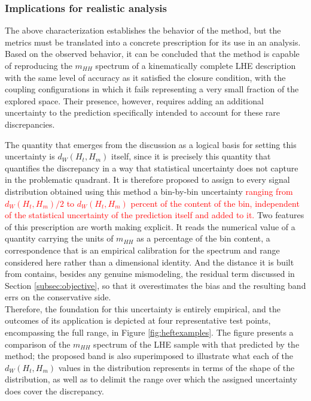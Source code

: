 
\subsubsection{Implications for realistic analysis}
\label{subsec:uncertainties}
%
The above characterization establishes the behavior of the method, but the metrics must be translated into a concrete prescription for its use in an analysis. Based on the observed behavior, it can be concluded that the method is capable of reproducing the $m_{HH}$ spectrum of a kinematically complete LHE description with the same level of accuracy as it satisfied the closure condition, with the coupling configurations in which it fails representing a very small fraction of the explored space. Their presence, however, requires adding an additional uncertainty to the prediction specifically intended to account for these rare discrepancies.

The quantity that emerges from the discussion as a logical basis for setting this uncertainty is $d_W(H_{t},H_{m})$ itself, since it is precisely this quantity that quantifies the discrepancy in a way that statistical uncertainty does not capture in the problematic quadrant. It is therefore proposed to assign to every signal distribution obtained using this method a bin-by-bin uncertainty \textcolor{red}{ranging from $d_W(H_{t},H_{m})/2$ to $d_W(H_{t},H_{m})$ percent of the content of the bin, independent of the statistical uncertainty of the prediction itself and added to it.} Two features of this prescription are worth making explicit. It reads the numerical value of a quantity carrying the units of $m_{HH}$ as a percentage of the bin content, a correspondence that is an empirical calibration for the spectrum and range considered here rather than a dimensional identity. And the distance it is built from contains, besides any genuine mismodeling, the residual term discussed in Section \ref{subsec:objective}, so that it overestimates the bias and the resulting band errs on the conservative side.\\

Therefore, the foundation for this uncertainty is entirely empirical, and the outcomes of its application is depicted at four representative test points, encompassing the full range, in Figure \ref{fig:heftexamples}. The figure presents a comparison of the $m_{HH}$ spectrum of the LHE sample with that predicted by the method; the proposed band is also superimposed to illustrate what each of the $d_W(H_{t},H_{m})$ values in the distribution represents in terms of the shape of the distribution, as well as to delimit the range over which the assigned uncertainty does cover the discrepancy.

